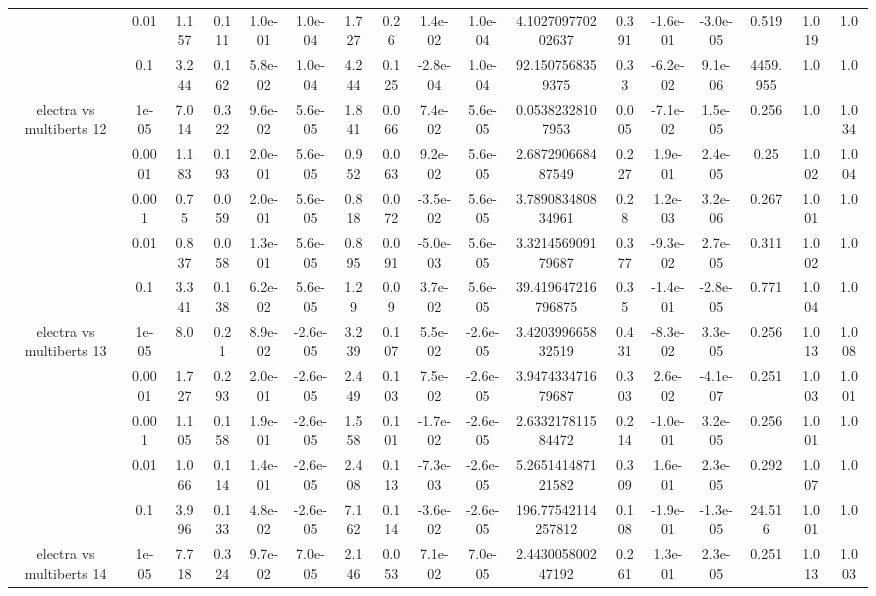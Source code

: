 \begin{tabular}{|c|c|c|c|c|c|c|c|c|c|c|c|c|c|c|c|c|}
 & 0.01 & 1.157 & 0.111 & 1.0e-01 & 1.0e-04 & 1.727 & 0.26 & 1.4e-02 & 1.0e-04 & 4.102709770202637 & 0.391 & -1.6e-01 & -3.0e-05 & 0.519 & 1.019 & 1.0 \\
 & 0.1 & 3.244 & 0.162 & 5.8e-02 & 1.0e-04 & 4.244 & 0.125 & -2.8e-04 & 1.0e-04 & 92.1507568359375 & 0.33 & -6.2e-02 & 9.1e-06 & 4459.955 & 1.0 & 1.0 \\
\hline
\multirow{5}{*}{electra  vs multiberts 12} & 1e-05 & 7.014 & 0.322 & 9.6e-02 & 5.6e-05 & 1.841 & 0.066 & 7.4e-02 & 5.6e-05 & 0.05382328107953 & 0.005 & -7.1e-02 & 1.5e-05 & 0.256 & 1.0 & 1.034 \\
 & 0.0001 & 1.183 & 0.193 & 2.0e-01 & 5.6e-05 & 0.952 & 0.063 & 9.2e-02 & 5.6e-05 & 2.687290668487549 & 0.227 & 1.9e-01 & 2.4e-05 & 0.25 & 1.002 & 1.004 \\
 & 0.001 & 0.75 & 0.059 & 2.0e-01 & 5.6e-05 & 0.818 & 0.072 & -3.5e-02 & 5.6e-05 & 3.789083480834961 & 0.28 & 1.2e-03 & 3.2e-06 & 0.267 & 1.001 & 1.0 \\
 & 0.01 & 0.837 & 0.058 & 1.3e-01 & 5.6e-05 & 0.895 & 0.091 & -5.0e-03 & 5.6e-05 & 3.321456909179687 & 0.377 & -9.3e-02 & 2.7e-05 & 0.311 & 1.002 & 1.0 \\
 & 0.1 & 3.341 & 0.138 & 6.2e-02 & 5.6e-05 & 1.29 & 0.09 & 3.7e-02 & 5.6e-05 & 39.419647216796875 & 0.35 & -1.4e-01 & -2.8e-05 & 0.771 & 1.004 & 1.0 \\
\hline
\multirow{5}{*}{electra  vs multiberts 13} & 1e-05 & 8.0 & 0.21 & 8.9e-02 & -2.6e-05 & 3.239 & 0.107 & 5.5e-02 & -2.6e-05 & 3.420399665832519 & 0.431 & -8.3e-02 & 3.3e-05 & 0.256 & 1.013 & 1.008 \\
 & 0.0001 & 1.727 & 0.293 & 2.0e-01 & -2.6e-05 & 2.449 & 0.103 & 7.5e-02 & -2.6e-05 & 3.947433471679687 & 0.303 & 2.6e-02 & -4.1e-07 & 0.251 & 1.003 & 1.001 \\
 & 0.001 & 1.105 & 0.158 & 1.9e-01 & -2.6e-05 & 1.558 & 0.101 & -1.7e-02 & -2.6e-05 & 2.633217811584472 & 0.214 & -1.0e-01 & 3.2e-05 & 0.256 & 1.001 & 1.0 \\
 & 0.01 & 1.066 & 0.114 & 1.4e-01 & -2.6e-05 & 2.408 & 0.113 & -7.3e-03 & -2.6e-05 & 5.265141487121582 & 0.309 & 1.6e-01 & 2.3e-05 & 0.292 & 1.007 & 1.0 \\
 & 0.1 & 3.996 & 0.133 & 4.8e-02 & -2.6e-05 & 7.162 & 0.114 & -3.6e-02 & -2.6e-05 & 196.77542114257812 & 0.108 & -1.9e-01 & -1.3e-05 & 24.516 & 1.001 & 1.0 \\
\hline
\multirow{5}{*}{electra  vs multiberts 14} & 1e-05 & 7.718 & 0.324 & 9.7e-02 & 7.0e-05 & 2.146 & 0.053 & 7.1e-02 & 7.0e-05 & 2.443005800247192 & 0.261 & 1.3e-01 & 2.3e-05 & 0.251 & 1.013 & 1.003 \\

\end{tabular}
